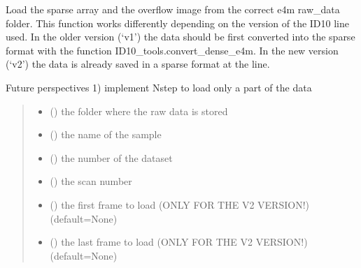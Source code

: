 \documentclass[letterpaper,10pt,english]{sphinxmanual}
\begin{document}
\begin{fulllineitems}
\label{\detokenize{index:ID10_tools.load_sparse_e4m}}
\pysigstartsignatures
\pysiglinewithargsret
{}
{\sphinxparamcomma {}\sphinxparamcomma {}\sphinxparamcomma {}\sphinxparamcomma {}\sphinxparamcomma {}\sphinxparamcomma {}}
{}
\pysigstopsignatures
\sphinxAtStartPar
Load the sparse array and the overflow image from the correct e4m raw\_data folder.
This function works differently depending on the version of the ID10 line used.
In the older version (‘v1’) the data should be first converted into the sparse format with the function ID10\_tools.convert\_dense\_e4m.
In the new version (‘v2’) the data is already saved in a sparse format at the line.

\sphinxAtStartPar
Future perspectives
1) implement Nstep to load only a part of the data
\begin{quote}\begin{description}
\begin{itemize}
\item {} 
\sphinxAtStartPar
{} () \textendash{} the folder where the raw data is stored

\item {} 
\sphinxAtStartPar
{} () \textendash{} the name of the sample

\item {} 
\sphinxAtStartPar
{} () \textendash{} the number of the dataset

\item {} 
\sphinxAtStartPar
{} () \textendash{} the scan number

\item {} 
\sphinxAtStartPar
{} () \textendash{} the first frame to load (ONLY FOR THE V2 VERSION!) (default=None)

\item {} 
\sphinxAtStartPar
{} () \textendash{} the last frame to load (ONLY FOR THE V2 VERSION!) (default=None)


\end{itemize}
\end{description}
\end{quote}
\end{fulllineitems}
\end{document}
